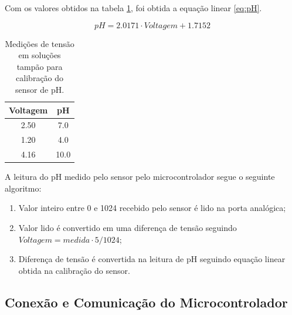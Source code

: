 Com os valores obtidos na tabela \ref{tab:calibra_ph}, foi obtida a equação linear \ref{eq:pH}.

\begin{equation}
    pH = 2.0171 \cdot Voltagem + 1.7152
    \label{eq:pH}
\end{equation}


\begin{table}[H]
    \begin{center}
        \begin{tabular}{ |c|c| } 
            \hline
            Voltagem & pH \\
            \hline
            2.50 & 7.0 \\ 
            \hline
            1.20 & 4.0 \\ 
            \hline
            4.16 & 10.0 \\ 
            \hline
        \end{tabular}
        \caption{\label{tab:calibra_ph}Medições de tensão em soluções tampão para calibração do sensor de pH.}
    \end{center}
\end{table}


A leitura do pH medido pelo sensor pelo microcontrolador segue o seguinte algoritmo:
\begin{enumerate}
    \item Valor inteiro entre 0 e 1024 recebido pelo sensor é lido na porta analógica;
    \item Valor lido é convertido em uma diferença de tensão seguindo \(Voltagem = medida \cdot 5 / 1024\);
    \item Diferença de tensão é convertida na leitura de pH seguindo equação linear obtida na calibração do sensor.
\end{enumerate}







\subsection{Conexão e Comunicação do Microcontrolador}

